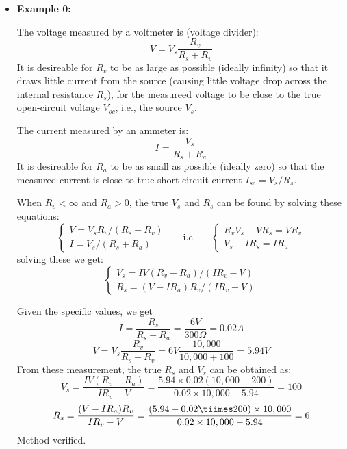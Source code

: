 \usepackage{html}



\begin{itemize}

\item {\bf Example 0:}


  The voltage measured by a voltmeter is (voltage divider):
  \[ V=V_s \frac{R_v}{R_s+R_v} \]
  It is desireable for $R_v$ to be as large as possible (ideally infinity) so 
  that it draws little current from the source (causing little voltage drop 
  across the internal resistance $R_s$), for the measureed voltage to be 
  close to the true open-circuit voltage $V_{oc}$, i.e., the source $V_s$. 

  The current measured by an ammeter is:
  \[ I=\frac{V_s}{R_s+R_a} \]
  It is desireable for $R_a$ to be as small as possible (ideally zero)
  so that the measured current is close to true short-circuit current 
  $I_{sc}=V_s/R_s$.

  When $R_v<\infty$ and $R_a>0$, the true $V_s$ and $R_s$ can be found by
  solving these equations:
  \[ \left\{ \begin{array}{l}
     V=V_s R_v/(R_s+R_v) \\I=V_s/(R_s+R_a) \end{array} \right. 
  \;\;\;\;\;\;\mbox{i.e.}\;\;\;\;\;\;
  \left\{ \begin{array}{l}
    R_vV_s-VR_s=VR_v \\ V_s-IR_s=I R_a \end{array} \right. \]
  solving these we get:
  \[ \left\{ \begin{array}{l}
    V_s=IV(R_v-R_a)/(IR_v-V) \\
    R_s=(V-IR_a)R_v/(IR_v-V)
  \end{array} \right. \]

  Given the specific values, we get
  \[ I=\frac{R_s}{R_s+R_a}=\frac{6V}{300\Omega}=0.02A \]
  \[ V=V_s \frac{R_v}{R_s+R_v}=6V \frac{10,000}{10,000+100}=5.94 V \]
  From these measurement, the true $R_s$ and $V_s$ can be obtained as:
  \[ V_s=\frac{IV(R_v-R_a)}{IR_v-V}
  =\frac{5.94\times 0.02(10,000-200)}{0.02\times 10,000-5.94}=100 \]
  \[ R_s=\frac{(V-IR_a)R_v}{IR_v-V} 
  =\frac{(5.94-0.02\tiimes 200)\times 10,000}{0.02\times 10,000-5.94}=6 \]
  Method verified.

\begin{comment}
\item {\bf Example 1:}


\end{comment}
\end{itemize}
